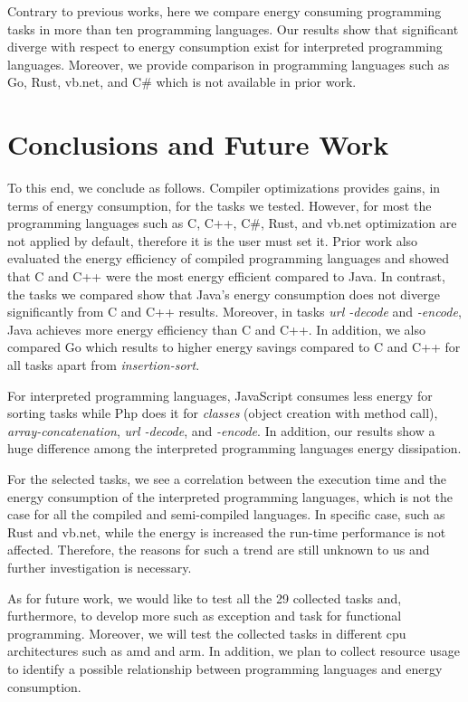 Contrary to previous works, here we compare energy consuming 
programming tasks in more than ten programming languages.
Our results show that significant diverge with respect to 
energy consumption exist for interpreted programming languages. 
Moreover, we provide comparison in programming languages such 
as Go, Rust, {\sc vb.net}, and C\# which is not available in 
prior work.


\section{Conclusions and Future Work} \label{conclusiona_and_future_work}


To this end, we conclude as follows. 
Compiler optimizations provides gains, in terms of energy 
consumption, for the tasks we tested. 
However, for most the programming languages such as C, C++, C\#, 
Rust, and {\sc vb.net} optimization are not applied by default, 
therefore it is the user must set it.  
Prior work \cite{abdulsalam_program_2014, chen_android_2016} 
also evaluated the energy efficiency of compiled programming languages 
and showed that C and C++ were the most energy efficient compared 
to Java. 
In contrast, the tasks we compared show that Java's 
energy consumption does not diverge significantly from C and C++ 
results. 
Moreover, in tasks \textit{url -decode} and \textit{-encode}, Java 
achieves more energy efficiency than C and C++.
In addition, we also compared Go which results to higher energy 
savings compared to C and C++ for all tasks apart from 
\textit{insertion-sort}.

For interpreted programming languages, JavaScript consumes less 
energy for sorting tasks while Php does it for \textit{classes} 
(object creation with method call), \textit{array-concatenation}, 
\textit{url -decode}, and \textit{-encode}. 
In addition, our results show a huge difference among the interpreted 
programming languages energy dissipation. 

For the selected tasks, we see a correlation between the execution 
time and the energy consumption of the interpreted programming 
languages, which is not the case for all the compiled and 
semi-compiled languages. 
In specific case, such as Rust and {\sc vb.net}, while the energy 
is increased the run-time performance is not affected. 
Therefore, the reasons for such a trend are still unknown to us 
and further investigation is necessary.

As for future work, we would like to test all the 29 collected 
tasks and, furthermore, to develop more such as exception 
and task for functional programming. 
Moreover, we will test the collected tasks in different {\sc cpu} 
architectures such as {\sc amd} and {\sc arm}. 
In addition, we plan to collect resource usage to identify 
a possible relationship between programming languages and energy consumption. 




